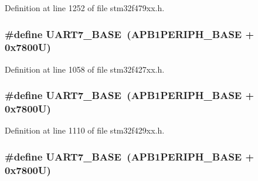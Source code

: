 Definition at line 1252 of file stm32f479xx.\+h.

\subsubsection[{\texorpdfstring{U\+A\+R\+T7\+\_\+\+B\+A\+SE}{UART7_BASE}}]{\setlength{\rightskip}{0pt plus 5cm}\#define U\+A\+R\+T7\+\_\+\+B\+A\+SE~({\bf A\+P\+B1\+P\+E\+R\+I\+P\+H\+\_\+\+B\+A\+SE} + 0x7800\+U)}\hypertarget{group___peripheral__memory__map_ga3150e4b10ec876c0b20f22de12a8fa40}{}\label{group___peripheral__memory__map_ga3150e4b10ec876c0b20f22de12a8fa40}


Definition at line 1058 of file stm32f427xx.\+h.

\subsubsection[{\texorpdfstring{U\+A\+R\+T7\+\_\+\+B\+A\+SE}{UART7_BASE}}]{\setlength{\rightskip}{0pt plus 5cm}\#define U\+A\+R\+T7\+\_\+\+B\+A\+SE~({\bf A\+P\+B1\+P\+E\+R\+I\+P\+H\+\_\+\+B\+A\+SE} + 0x7800\+U)}\hypertarget{group___peripheral__memory__map_ga3150e4b10ec876c0b20f22de12a8fa40}{}\label{group___peripheral__memory__map_ga3150e4b10ec876c0b20f22de12a8fa40}


Definition at line 1110 of file stm32f429xx.\+h.

\subsubsection[{\texorpdfstring{U\+A\+R\+T7\+\_\+\+B\+A\+SE}{UART7_BASE}}]{\setlength{\rightskip}{0pt plus 5cm}\#define U\+A\+R\+T7\+\_\+\+B\+A\+SE~({\bf A\+P\+B1\+P\+E\+R\+I\+P\+H\+\_\+\+B\+A\+SE} + 0x7800\+U)}\hypertarget{group___peripheral__memory__map_ga3150e4b10ec876c0b20f22de12a8fa40}{}\label{group___peripheral__memory__map_ga3150e4b10ec876c0b20f22de12a8fa40}


